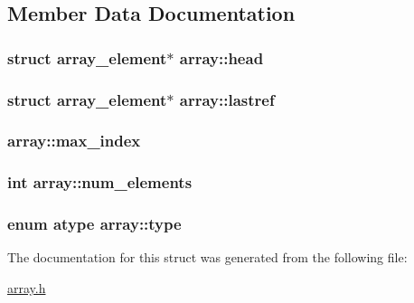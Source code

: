 \subsection{Member Data Documentation}
\subsubsection[{\texorpdfstring{head}{head}}]{\setlength{\rightskip}{0pt plus 5cm}struct {\bf array\+\_\+element}$\ast$ array\+::head}\hypertarget{structarray_ac9efd0fe7a5541bd146bd5481dd851cc}{}\label{structarray_ac9efd0fe7a5541bd146bd5481dd851cc}
\subsubsection[{\texorpdfstring{lastref}{lastref}}]{\setlength{\rightskip}{0pt plus 5cm}struct {\bf array\+\_\+element}$\ast$ array\+::lastref}\hypertarget{structarray_a1dce002b80f5a241fd5e5efd9ad82494}{}\label{structarray_a1dce002b80f5a241fd5e5efd9ad82494}
\subsubsection[{\texorpdfstring{max\+\_\+index}{max_index}}]{ array\+::max\+\_\+index}\hypertarget{structarray_a943ecba4fe38c813000d0887e7859418}{}\label{structarray_a943ecba4fe38c813000d0887e7859418}
\subsubsection[{\texorpdfstring{num\+\_\+elements}{num_elements}}]{\setlength{\rightskip}{0pt plus 5cm}int array\+::num\+\_\+elements}\hypertarget{structarray_a229c94ec6c46937062a5fd69e488042d}{}\label{structarray_a229c94ec6c46937062a5fd69e488042d}
\subsubsection[{\texorpdfstring{type}{type}}]{\setlength{\rightskip}{0pt plus 5cm}enum {\bf atype} array\+::type}\hypertarget{structarray_a0af29fc53de2cf89bf3945427930dc0f}{}\label{structarray_a0af29fc53de2cf89bf3945427930dc0f}


The documentation for this struct was generated from the following file\+:\begin{DoxyCompactItemize}
\item 
\hyperlink{array_8h}{array.\+h}\end{DoxyCompactItemize}
